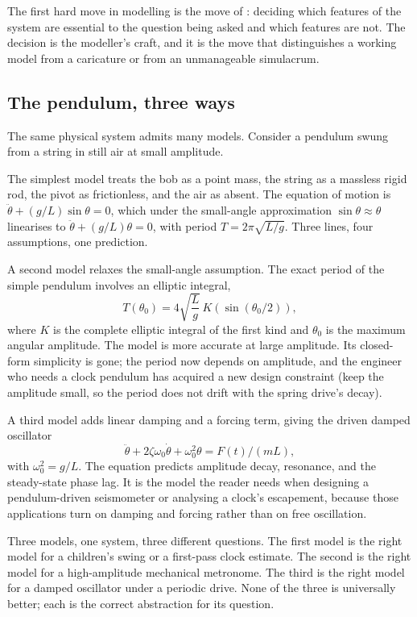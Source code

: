 The first hard move in modelling is the move of :
deciding which features of the system are essential to the question
being asked and which features are not. The decision is the modeller's
craft, and it is the move that distinguishes a working model from a
caricature or from an unmanageable simulacrum.

\subsection{The pendulum, three ways}

The same physical system admits many models. Consider a pendulum
swung from a string in still air at small amplitude.

The simplest model treats the bob as a point mass, the string as a
massless rigid rod, the pivot as frictionless, and the air as absent.
The equation of motion is $\ddot\theta + (g/L) \sin\theta = 0$, which
under the small-angle approximation $\sin\theta \approx \theta$
linearises to $\ddot\theta + (g/L)\theta = 0$, with period
$T = 2\pi\sqrt{L/g}$. Three lines, four assumptions, one prediction.

A second model relaxes the small-angle assumption. The exact period of
the simple pendulum involves an elliptic integral,
\[
T(\theta_{0}) = 4\sqrt{\frac{L}{g}}\, K(\sin(\theta_{0}/2)),
\]
where $K$ is the complete elliptic integral of the first kind and
$\theta_{0}$ is the maximum angular amplitude. The model is more
accurate at large amplitude. Its closed-form simplicity is gone; the
period now depends on amplitude, and the engineer who needs a clock
pendulum has acquired a new design constraint (keep the amplitude
small, so the period does not drift with the spring drive's decay).

A third model adds linear damping and a forcing term, giving the
driven damped oscillator
\[
\ddot\theta + 2\zeta\omega_{0}\dot\theta + \omega_{0}^{2}\theta
  = F(t)/(mL),
\]
with $\omega_{0}^{2} = g/L$. The equation predicts amplitude decay,
resonance, and the steady-state phase lag. It is the model the reader
needs when designing a pendulum-driven seismometer or analysing a
clock's escapement, because those applications turn on damping and
forcing rather than on free oscillation.

Three models, one system, three different questions. The first model
is the right model for a children's swing or a first-pass clock
estimate. The second is the right model for a high-amplitude
mechanical metronome. The third is the right model for a damped
oscillator under a periodic drive. None of the three is universally
better; each is the correct abstraction for its question.

